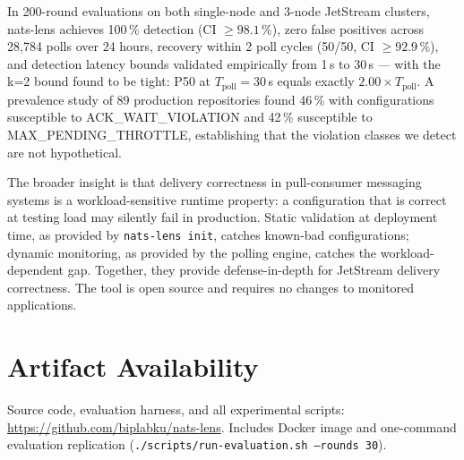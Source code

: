 \documentclass[journal]{IEEEtran}
\begin{document}
In 200-round evaluations on both single-node and 3-node JetStream
clusters, nats-lens achieves 100\,\% detection (CI $\geq 98.1\,\%$),
zero false positives across 28,784 polls over 24 hours, recovery
within 2 poll cycles (50/50, CI $\geq 92.9\,\%$), and detection latency
bounds validated empirically from 1\,s to 30\,s --- with the k{=}2 bound
found to be tight: P50 at $T_\text{poll}{=}30$\,s equals exactly
$2.00\times T_\text{poll}$. A prevalence study of 89 production repositories found
46\,\% with configurations susceptible to ACK\_WAIT\_VIOLATION and
42\,\% susceptible to MAX\_PENDING\_THROTTLE, establishing that the
violation classes we detect are not hypothetical.

The broader insight is that delivery correctness in pull-consumer
messaging systems is a workload-sensitive runtime property: a
configuration that is correct at testing load may silently fail in
production. Static validation at deployment time, as provided by
\texttt{nats-lens init}, catches known-bad configurations; dynamic
monitoring, as provided by the polling engine, catches the
workload-dependent gap. Together, they provide defense-in-depth for
JetStream delivery correctness. The tool is open source and requires no
changes to monitored applications.

\section*{Artifact Availability}

Source code, evaluation harness, and all experimental scripts:
\url{https://github.com/biplabku/nats-lens}. Includes Docker image and
one-command evaluation replication (\texttt{./scripts/run-evaluation.sh
--rounds 30}).
\end{document}
